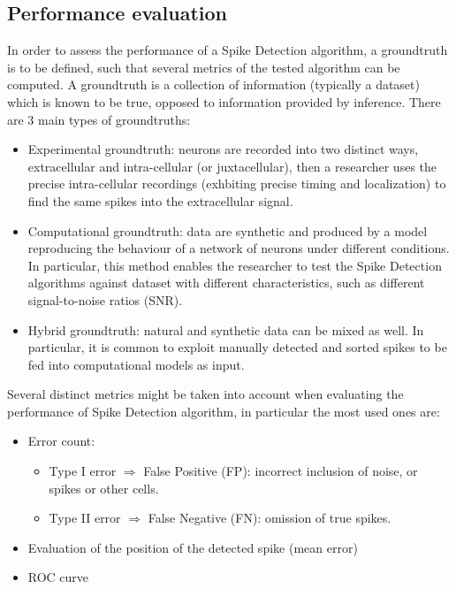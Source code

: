 \subsection{Performance evaluation}
In order to assess the performance of a Spike Detection algorithm, a groundtruth
is to be defined, such that several metrics of the tested algorithm can be
computed. A groundtruth is a collection of information (typically a dataset)
which is known to be true, opposed to information provided by inference.
There are 3 main types of groundtruths:
\begin{itemize}
    \item Experimental groundtruth: neurons are recorded into two distinct ways,
          extracellular and intra-cellular (or juxtacellular), then a researcher uses
          the precise intra-cellular recordings (exhbiting precise timing and
          localization) to find the same spikes into the extracellular signal.
    \item Computational groundtruth: data are synthetic and produced by a
          model reproducing the behaviour of a network of neurons under different
          conditions. In particular, this method enables the researcher to test the
          Spike Detection algorithms against dataset with different characteristics,
          such as different signal-to-noise ratios (SNR).
    \item Hybrid groundtruth: natural and synthetic data can be mixed as well. In
          particular, it is common to exploit manually detected and sorted spikes to be
          fed into computational models as input.
\end{itemize}
Several distinct metrics might be taken into account when evaluating the
performance of Spike Detection algorithm, in particular the most used ones are:
\begin{itemize}
    \item Error count:
          \begin{itemize}
              \item Type I error \(\Rightarrow\) False Positive (FP): incorrect
                    inclusion of noise, or spikes or other cells.
              \item Type II error \(\Rightarrow\) False Negative (FN): omission of
                    true spikes.
          \end{itemize}
    \item Evaluation of the position of the detected spike (mean error)
    \item ROC curve
\end{itemize}
